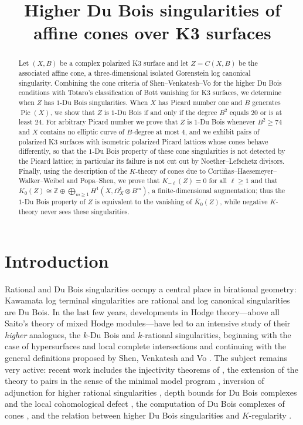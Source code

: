 \documentclass[11pt]{amsart}
\title[Higher Du Bois singularities of cones over K3 surfaces]{Higher Du Bois singularities of affine cones over K3 surfaces}
\numberwithin{equation}{section}
\theoremstyle{plain}
\theoremstyle{definition}
\theoremstyle{remark}
\newcommand{\ZZ}{\mathbb{Z}}
\newcommand{\Pic}{\operatorname{Pic}}
\newcommand{\Kzero}{K_0}
\begin{document}
\begin{abstract}
Let $(X,B)$ be a complex polarized K3 surface and let $Z=C(X,B)$ be the associated affine cone, a three-dimensional isolated Gorenstein log canonical singularity.
Combining the cone criteria of Shen--Venkatesh--Vo for the higher Du Bois conditions with Totaro's classification of Bott vanishing for K3 surfaces, we determine when $Z$ has $1$-Du Bois singularities.
When $X$ has Picard number one and $B$ generates $\Pic(X)$, we show that $Z$ is $1$-Du Bois if and only if the degree $B^2$ equals $20$ or is at least $24$.
For arbitrary Picard number we prove that $Z$ is $1$-Du Bois whenever $B^2\ge 74$ and $X$ contains no elliptic curve of $B$-degree at most $4$, and we exhibit pairs of polarized K3 surfaces with isometric polarized Picard lattices whose cones behave differently, so that the $1$-Du Bois property of these cone singularities is not detected by the Picard lattice; in particular its failure is not cut out by Noether--Lefschetz divisors.
Finally, using the description of the $K$-theory of cones due to Corti\~nas--Haesemeyer--Walker--Weibel and Popa--Shen, we prove that $K_{-\ell}(Z)=0$ for all $\ell\ge 1$ and that $\Kzero(Z)\cong \ZZ\oplus\bigoplus_{m\ge 1}H^1(X,\Omega^1_X\otimes B^m)$, a finite-dimensional augmentation; thus the $1$-Du Bois property of $Z$ is equivalent to the vanishing of $\widetilde{\Kzero}(Z)$, while negative $K$-theory never sees these singularities.
\end{abstract}


\maketitle

\section{Introduction}\label{sec:intro}

Rational and Du Bois singularities occupy a central place in birational geometry: Kawamata log terminal singularities are rational and log canonical singularities are Du Bois.
In the last few years, developments in Hodge theory---above all Saito's theory of mixed Hodge modules---have led to an intensive study of their \emph{higher} analogues, the $k$-Du Bois and $k$-rational singularities, beginning with the case of hypersurfaces and local complete intersections \cite{MOPW,JKSY,MP,CDM,FL} and continuing with the general definitions proposed by Shen, Venkatesh and Vo \cite{SVV}.
The subject remains very active: recent work includes the injectivity theorems of \cite{PSV}, the extension of the theory to pairs in the sense of the minimal model program \cite{NN}, inversion of adjunction for higher rational singularities \cite{KW}, depth bounds for Du Bois complexes and the local cohomological defect \cite{Bur}, the computation of Du Bois complexes of cones \cite{PS}, and the relation between higher Du Bois singularities and $K$-regularity \cite{Sh}.
\end{document}
